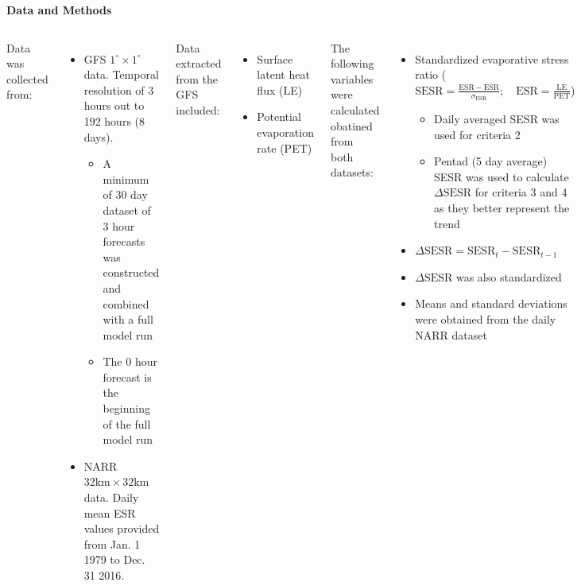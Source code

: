\documentclass{beamer}
\begin{document}
\begin{frame}[t]{}
\begin{columns}[t]
			\begin{creambox}
				\begin{block}{\bfseries Data and Methods}
					\begin{columns}[t]
						Data was collected from:
						\begin{itemize}
							\item GFS $1^{\circ} \times 1^{\circ}$ data. Temporal resolution of 3 hours out to 192 hours (8 days).
							\begin{itemize}
								\item A minimum of 30 day dataset of 3 hour forecasts was constructed and combined with a full model run
								\item The 0 hour forecast is the beginning of the full model run
							\end{itemize}
							\item NARR $32\text{km} \times 32\text{km}$ data. Daily mean ESR values provided from Jan. 1 1979 to Dec. 31 2016.
						\end{itemize}
						Data extracted from the GFS included:
						\begin{itemize}
							\item Surface latent heat flux (LE)
							\item Potential evaporation rate (PET)
						\end{itemize}
						The following variables were calculated obatined from both datasets:
						\begin{itemize}
							\item Standardized evaporative stress ratio ($\text{SESR} = \frac{\text{ESR} - \overline{\text{ESR}}}{\sigma _{\text{ESR}}}; \quad \text{ESR} = \frac{\text{LE}}{\text{PET}}$)
							\begin{itemize}
								\item Daily averaged SESR was used for criteria 2
								\item Pentad (5 day average) SESR was used to calculate $\Delta \text{SESR}$ for criteria 3 and 4 as they better represent the trend
							\end{itemize}
							\item $\Delta \text{SESR} = \text{SESR}_{t} - \text{SESR}_{t-1}$
							\item $\Delta \text{SESR}$ was also standardized
							\item Means and standard deviations were obtained from the daily NARR dataset
						\end{itemize}
					

\end{columns}
\end{block}
\end{creambox}
\end{columns}
\end{frame}
\end{document}
